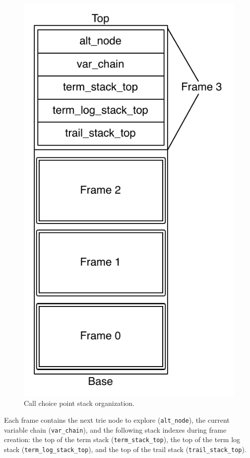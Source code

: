 \begin{figure}[ht]
  \centering
    \includegraphics[scale=0.6]{call_choice_point_stack.pdf}
  \caption{Call choice point stack organization.}
  \label{fig:call_choice_point_stack}
\end{figure}

Each frame contains the next trie node to explore (\texttt{alt\_node}),
the current variable chain (\texttt{var\_chain}),
and the following stack indexes during frame creation:
the top of the term stack (\texttt{term\_stack\_top}),
the top of the term log stack (\texttt{term\_log\_stack\_top}),
and the top of the trail stack (\texttt{trail\_stack\_top}).

